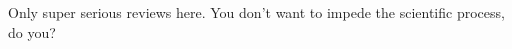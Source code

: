 \documentclass[12pt]{sigbovik-review}
\author{Your name or something else equally stupid}
\begin{document}
\maketitle

Only super serious reviews here.
You don't want to impede the scientific process, do you?
\end{document}

